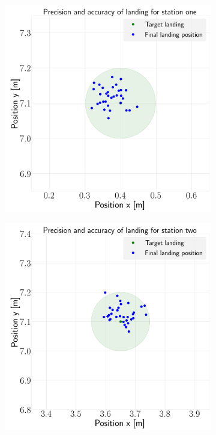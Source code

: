 \documentclass[../Head/report.tex]{subfiles}
\begin{document}
\begin{figure}[H]
    \centering
    \begin{subfigure}[t]{.30\textwidth}
        \centering
        \includegraphics[width=\textwidth]{../Figures/landing_test/test4_speed_0.1_error_0.05/landing_for_station_one.png}
        \caption{}
        \label{fig:vision_based_landing_landing_station_one_test4}
    \end{subfigure}
     \hspace{0.2em}
    \begin{subfigure}[t]{.30\textwidth}
        \centering
        \includegraphics[width=\textwidth]{../Figures/landing_test/test4_speed_0.1_error_0.05/landing_for_station_two.png}

\end{subfigure}
\end{figure}
\end{document}
